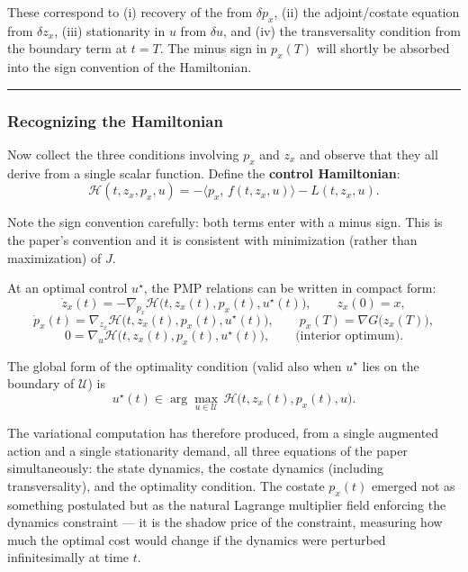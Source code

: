 \documentclass{article}
\begin{document}
\smallskip

These correspond to (i) recovery of the from $\delta p_x$, (ii) the adjoint/costate equation from $\delta z_x$, (iii) stationarity in $u$ from $\delta u$, and (iv) the transversality condition from the boundary term at $t=T$. The minus sign in $p_x(T)$ will shortly be absorbed into the sign convention of the Hamiltonian.

\medskip\hrule\medskip

\begin{tldrbox}
\subsubsection{Recognizing the Hamiltonian}

Now collect the three conditions involving $p_x$ and $z_x$ and observe that they all derive from a single scalar function. Define the \textbf{control Hamiltonian}:
\[
\mathcal{H}(t, z_x, p_x, u) = -\langle p_x,\, f(t, z_x, u)\rangle - L(t, z_x, u).
\label{eq:control-hamiltonian}
\]

Note the sign convention carefully: both terms enter with a minus sign. This is the paper's convention and it is consistent with minimization (rather than maximization) of $J$.

At an optimal control $u^\star$, the PMP relations can be written in compact form:
\begin{equation}
\dot{z}_x(t) = -\nabla_{p_x}\mathcal{H}\bigl(t, z_x(t), p_x(t), u^\star(t)\bigr), \qquad z_x(0)=x,
\label{eq:pmp-state}
\end{equation}
\begin{equation}
\dot{p}_x(t) = \nabla_{z_x}\mathcal{H}\bigl(t, z_x(t), p_x(t), u^\star(t)\bigr), \qquad p_x(T)=\nabla G\bigl(z_x(T)\bigr),
\label{eq:pmp-costate}
\end{equation}
\begin{equation}
0 = \nabla_{u}\mathcal{H}\bigl(t, z_x(t), p_x(t), u^\star(t)\bigr), \qquad \text{(interior optimum)}.
\label{eq:pmp-stationarity}
\end{equation}

The global form of the optimality condition (valid also when $u^\star$ lies on the boundary of $\mathcal{U}$) is
\[
 u^\star(t) \in \arg\max_{u \in \mathcal{U}}\, \mathcal{H}\bigl(t, z_x(t), p_x(t), u\bigr).
\label{eq:pmp-max}
\]

The variational computation has therefore produced, from a single augmented action and a single stationarity demand, all three equations of the paper simultaneously: the state dynamics, the costate dynamics (including transversality), and the optimality condition. The costate $p_x(t)$ emerged not as something postulated but as the natural Lagrange multiplier field enforcing the dynamics constraint — it is the shadow price of the constraint, measuring how much the optimal cost would change if the dynamics were perturbed infinitesimally at time $t$.
\end{tldrbox}
\end{document}
